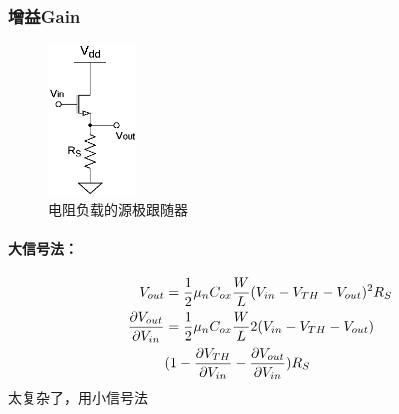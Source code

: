 \documentclass[twoside,a4paper,openright,titlepage,draft]{ctexrep}
\begin{document}
\subsubsection{增益Gain}
\begin{multicols}{2}
    \begin{figure}[H]
        \centering
        \includegraphics[height=40mm]{sourcefollower2.eps}
        \caption{电阻负载的源极跟随器}
        \label{fig:电阻负载的源极跟随器}
    \end{figure}
    \columnbreak
    \paragraph{大信号法：}
    \begin{align}
        V_{out} &= \frac{1}{2}\mu_n C_{ox}\frac{W}{L}(V_{in} - V_{TH} - V_{out})^2R_S \notag \\
        \frac{\partial V_{out}}{\partial V_{in}} &= \frac{1}{2}\mu_nC_{ox}\frac{W}{L}2(V_{in} - V_{TH} - V_{out})\notag \\
        &(1-\frac{\partial V_{TH}}{\partial V_{in}}-\frac{\partial V_{out}}{\partial V_{in}})R_S \notag
    \end{align}
    太复杂了，用小信号法
\end{multicols}
\end{document}
